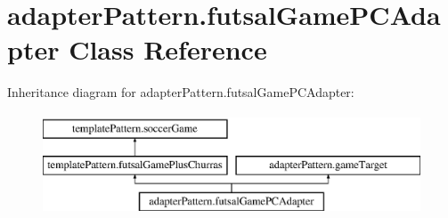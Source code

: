 \hypertarget{classadapter_pattern_1_1futsal_game_p_c_adapter}{}\section{adapter\+Pattern.\+futsal\+Game\+P\+C\+Adapter Class Reference}
\label{classadapter_pattern_1_1futsal_game_p_c_adapter}
Inheritance diagram for adapter\+Pattern.\+futsal\+Game\+P\+C\+Adapter\+:\begin{figure}[H]
\begin{center}
\leavevmode
\includegraphics[height=3.000000cm]{classadapter_pattern_1_1futsal_game_p_c_adapter}
\end{center}
\end{figure}
